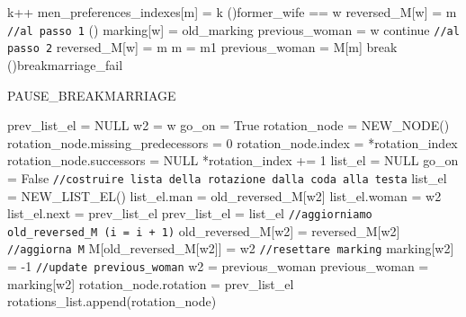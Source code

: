 \documentclass[12pt]{article}
\begin{document}
\begin{algorithm}[H]
{{{{    				k++\;
    			}
    			men\_preferences\_indexes[m] = k\;
                    \;
                    \eIf (){former\_wife == w} {
                        reversed\_M[w] = m\;
                        \Return \texttt{//al passo 1}\;
                    } () {
                         {
                            marking[w] = old\_marking\;
                            previous\_woman = w\;
                            continue \texttt{//al passo 2}\;
                        } {
                            reversed\_M[w] = m\;
                            m = m1\;
                            previous\_woman = M[m]\;
                            break\;
                        }
                    }
                }
            }
            \If(){breakmarriage\_fail} {
                \Return\;
            }
        }
    \end{algorithm}

    \begin{algorithm}[H]
        \scriptsize
        \DontPrintSemicolon
        \caption{PAUSE\_BREAKMARRIAGE}\label{alg:PauseBreakmarriage}
        \;
        prev\_list\_el = NULL\;
	w2 = w\;
	go\_on = True\;
	rotation\_node = NEW\_NODE()\;
        rotation\_node.missing\_predecessors = 0\;
	rotation\_node.index = *rotation\_index\;
	rotation\_node.successors = NULL\;
        *rotation\_index += 1\;
	list\_el = NULL\;
        \;
	 {
            go\_on = False\;
		\texttt{//costruire lista della rotazione dalla coda alla testa}\;
		list\_el = NEW\_LIST\_EL()\;
		list\_el.man = old\_reversed\_M[w2]\;
            list\_el.woman = w2\;
		list\_el.next = prev\_list\_el\;
		prev\_list\_el = list\_el\;
		\;
            \texttt{//aggiorniamo old\_reversed\_M (i = i + 1)}\;
		old\_reversed\_M[w2] = reversed\_M[w2]\;
		\texttt{//aggiorna M}\;
		M[old\_reversed\_M[w2]] = w2\;
		\texttt{//resettare marking}\;
		marking[w2] = -1\;
		\texttt{//update previous\_woman}\;
		w2 = previous\_woman\;
		previous\_woman = marking[w2]\;
        }
	\;	
	rotation\_node.rotation = prev\_list\_el\;
        rotations\_list.append(rotation\_node)\;
        \;
        \Return\;
    \end{algorithm}
\end{document}
